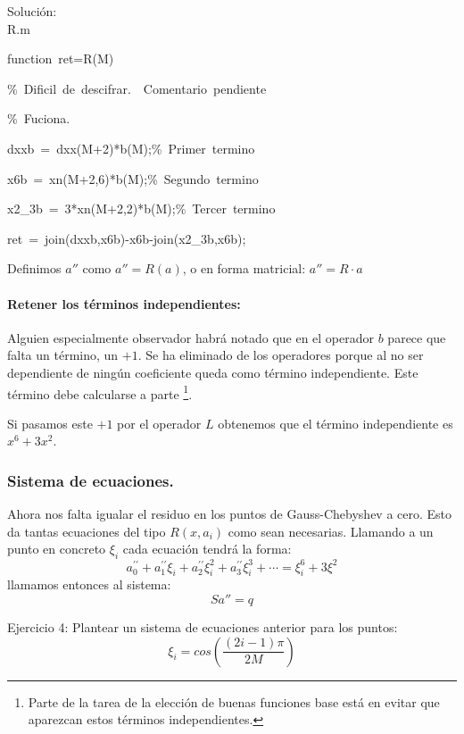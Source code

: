 Solución:\\
R.m

\begin{lyxcode}
function~ret=R(M)

\%~Dificil~de~descifrar.~~Comentario~pendiente

\%~Fuciona.

dxxb~=~dxx(M+2){*}b(M);\%~Primer~termino

x6b~=~xn(M+2,6){*}b(M);\%~Segundo~termino

x2\_3b~=~3{*}xn(M+2,2){*}b(M);\%~Tercer~termino

ret~=~join(dxxb,x6b)-x6b-join(x2\_3b,x6b);
\end{lyxcode}
\lyxline{\normalsize}

Definimos $a''$ como $a''=R(a)$, o en forma matricial: $a''=R\cdot a$


\paragraph{Retener los términos independientes:}

Alguien especialmente observador habrá notado que en el operador $b$
parece que falta un término, un $+1$. Se ha eliminado de los operadores
porque al no ser dependiente de ningún coeficiente queda como término
independiente. Este término debe calcularse a parte%
\footnote{Parte de la tarea de la elección de buenas funciones base está en
evitar que aparezcan estos términos independientes.%
}.

Si pasamos este $+1$ por el operador $L$ obtenemos que el término
independiente es $x^{6}+3x^{2}$.


\subsubsection{Sistema de ecuaciones.}

Ahora nos falta igualar el residuo en los puntos de Gauss-Chebyshev
a cero. Esto da tantas ecuaciones del tipo $R(x,a_{i})$ como sean
necesarias. Llamando a un punto en concreto $\xi_{i}$ cada ecuación
tendrá la forma:\[
a_{0}^{\prime\prime}+a_{1}^{\prime\prime}\xi_{i}+a_{2}^{\prime\prime}\xi_{i}^{2}+a_{3}^{\prime\prime}\xi_{i}^{3}+\cdots=\xi_{i}^{6}+3\xi^{2}\]
llamamos entonces al sistema:\[
Sa''=q\]


\lyxline{\normalsize}

Ejercicio 4: Plantear un sistema de ecuaciones anterior para los puntos:\[
\xi_{i}=cos\left(\frac{(2i-1)\pi}{2M}\right)\]


